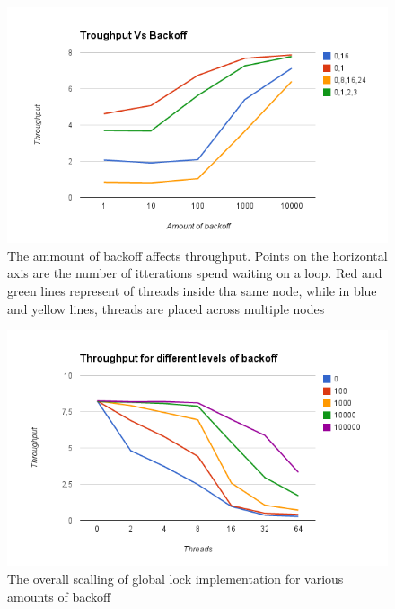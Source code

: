 \begin{figure}
 \centering
  \includegraphics[scale=0.7]{queue_global_backoff_1.png}
\caption{The ammount of backoff affects throughput. Points on the horizontal axis are the number of itterations spend waiting on a loop. Red and green lines represent of threads inside tha same node, while in blue and yellow lines, threads are placed across multiple nodes}
\label{queue_global_backoff_1}
\end{figure}

\begin{figure}
 \centering
  \includegraphics[scale=0.7]{queue_global_backoff_2.png}
\caption{The overall scalling of global lock implementation for various amounts of backoff}
\label{queue_global_backoff_2}
\end{figure}

